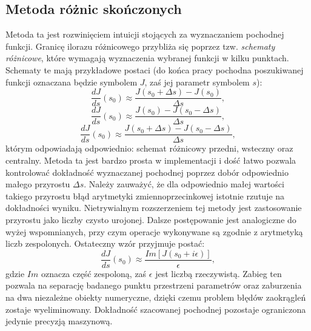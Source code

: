 \documentclass[12pt]{article}
\begin{document}
\subsection{Metoda różnic skończonych}
Metoda ta jest rozwinięciem intuicji stojących za wyznaczaniem pochodnej funkcji. Granicę ilorazu różnicowego przybliża się poprzez tzw. \textit{schematy różnicowe}, które wymagają wyznaczenia wybranej funkcji w kilku punktach. Schematy te mają przykładowe postaci (do końca pracy pochodna poszukiwanej funkcji oznaczana będzie symbolem $ J $, zaś jej parametr symbolem $ s $):
\begin{equation}
\frac{dJ}{ds}(s_{0}) \approx \frac{J(s_{0}+\Delta s) - J(s_{0})}{\Delta s},
\end{equation} 
\begin{equation}
\frac{dJ}{ds}(s_{0}) \approx \frac{J(s_{0}) - J(s_{0}-\Delta s)}{\Delta s},
\end{equation} 
\begin{equation}
\frac{dJ}{ds}(s_{0}) \approx \frac{J(s_{0}+\Delta s) - J(s_{0}-\Delta s)}{\Delta s},
\end{equation}
którym odpowiadają odpowiednio: schemat różnicowy przedni, wsteczny oraz centralny. \newline
Metoda ta jest bardzo prosta w implementacji i dość łatwo pozwala kontrolować dokładność wyznaczanej pochodnej poprzez dobór odpowiednio małego przyrostu $ \Delta s  $. Należy zauważyć, że dla odpowiednio małej wartości takiego przyrostu błąd arytmetyki zmiennoprzecinkowej istotnie rzutuje na dokładności wyniku. Nietrywialnym rozszerzeniem tej metody jest zastosowanie przyrostu jako liczby czysto urojonej. Dalsze postępowanie jest analogiczne do wyżej wspomnianych, przy czym operacje wykonywane są zgodnie z arytmetyką liczb zespolonych. Ostateczny wzór przyjmuje postać:
\begin{equation}
\frac{dJ}{ds}(s_{0}) \approx \frac{Im[J(s_{0}+i\epsilon)]}{\epsilon},
\end{equation}
gdzie $ Im $ oznacza część zespoloną, zaś $\epsilon$ jest liczbą rzeczywistą. Zabieg ten pozwala na separację badanego punktu przestrzeni parametrów oraz zaburzenia na dwa niezależne obiekty numeryczne, dzięki czemu problem błędów zaokrągleń zostaje wyeliminowany. Dokładność szacowanej pochodnej pozostaje ograniczona jedynie precyzją maszynową.
\end{document}
